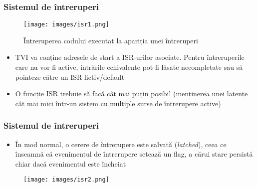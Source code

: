 \documentclass[xcolor={table}]{beamer}
\begin{document}
		\begin{frame}
            \frametitle{Sistemul de întreruperi}
            \begin{figure}
                \centering
                \texttt{[image: images/isr1.png]}
                \caption{Întreruperea codului executat la apariția unei întreruperi}
            \end{figure}
            \begin{itemize}
                \item TVI va conține adresele de start a ISR-urilor asociate. Pentru întreruperile care nu vor fi active, intrările echivalente pot fi lăsate necompletate sau să pointeze către un ISR fictiv/default
                \item O funcție ISR trebuie să facă cât mai puțin posibil (menținerea unei latențe cât mai mici într-un sistem cu multiple surse de întrerupere active)

            \end{itemize}   
        \end{frame}
		\begin{frame}
            \frametitle{Sistemul de întreruperi}
            \begin{itemize}
                \item În mod normal, o cerere de întrerupere este salvată (\textit{latched}), ceea ce înseamnă că evenimentul de întrerupere setează un flag, a cărui stare persistă chiar dacă evenimentul este încheiat
            \end{itemize}
            \begin{figure}
                \centering
                \texttt{[image: images/isr2.png]}
            \end{figure}
		\end{frame}
\end{document}

